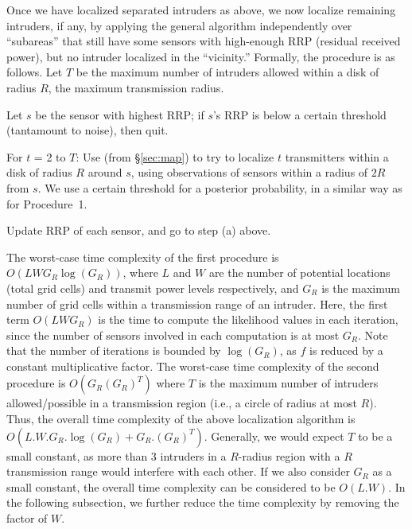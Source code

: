   Once we
have localized separated intruders as above, we now localize remaining
intruders, if any, by applying the general \map algorithm
independently over ``subareas'' that still have some sensors with
high-enough RRP (residual received power), but no intruder localized
in the ``vicinity.'' Formally, the procedure is as follows. Let $T$ be
the maximum number of intruders allowed within a disk of radius $R$,
the maximum transmission radius.

\begin{packedalpha}
 \item
Let $s$ be the sensor with highest RRP; if $s$'s RRP is below a
certain threshold (tantamount to noise), then quit.

\item
For $t$ = 2 to $T$: Use \map (from \S\ref{sec:map}) to try to localize
$t$ transmitters within a disk of radius $R$ around $s$, using
observations of sensors within a radius of $2R$ from $s$. We use a
certain threshold for a posterior probability, in a similar way as for
Procedure~1.

\item
Update RRP of each sensor, and go to step (a) above.
\end{packedalpha}

 The worst-case time complexity of the first procedure is \\
$O(LWG_R\log(G_R))$, where $L$ and $W$ are the number
of potential locations (total grid cells) and transmit power levels
respectively, and $G_R$ is the maximum number of grid cells within a
transmission range of an intruder.
Here, the first term $O(LWG_R)$ is the time to compute the likelihood
values in each iteration, since the number of sensors involved in each
computation is at most $G_R$. Note that the number of iterations is
bounded by $\log(G_R)$, as $f$ is reduced by a constant multiplicative
factor.
The worst-case time complexity of the second procedure is
$O(G_R(G_R)^T)$ where $T$ is the maximum number of intruders
allowed/possible in a transmission region (i.e., a circle of radius at
most $R$).
Thus, the overall time complexity of the above localization algorithm
is $O(L.W.G_R.\log(G_R) + G_R.(G_R)^T)$.
Generally, we would expect $T$ to be a small constant, as more than 3
intruders in a $R$-radius region with a $R$ transmission range would
interfere with each other. If we also consider $G_R$ as a small
constant, the overall time complexity can be considered to be
$O(L.W)$.  In the following subsection, we further reduce the time
complexity by removing the factor of $W$.

